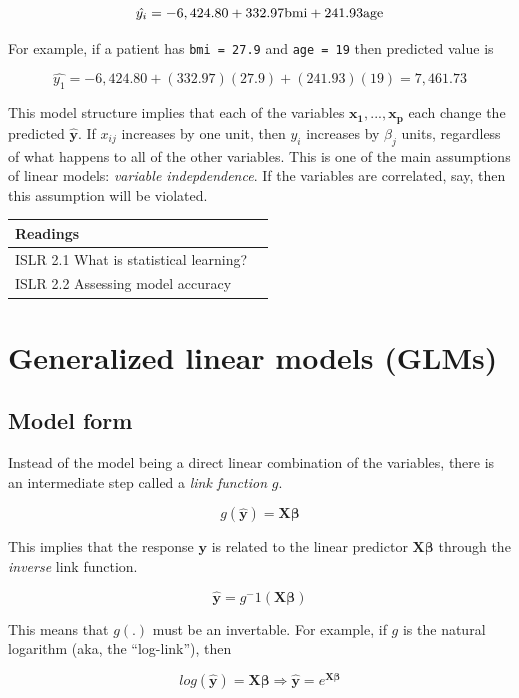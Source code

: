 \documentclass[]{book}
\begin{document}
\[\hat{y_i} = -6,424.80 + 332.97 \space\text{bmi} + 241.93\space \text{age}\]

For example, if a patient has \texttt{bmi\ =\ 27.9} and \texttt{age\ =\ 19} then predicted value is

\[\hat{y_1} = -6,424.80 + (332.97)(27.9) + (241.93)(19) = 7,461.73\]

This model structure implies that each of the variables \(\mathbf{x_1}, ..., \mathbf{x_p}\) each change the predicted \(\mathbf{\hat{y}}\). If \(x_{ij}\) increases by one unit, then \(y_i\) increases by \(\beta_j\) units, regardless of what happens to all of the other variables. This is one of the main assumptions of linear models: \emph{variable indepdendence}. If the variables are correlated, say, then this assumption will be violated.

\begin{longtable}[]{@{}ll@{}}
\toprule
Readings &\tabularnewline
\midrule
\endhead
ISLR 2.1 What is statistical learning? &\tabularnewline
ISLR 2.2 Assessing model accuracy &\tabularnewline
\bottomrule
\end{longtable}

\hypertarget{generalized-linear-models-glms}{%
\chapter{Generalized linear models (GLMs)}\label{generalized-linear-models-glms}}

\hypertarget{model-form}{%
\section{Model form}\label{model-form}}

Instead of the model being a direct linear combination of the variables, there is an intermediate step called a \emph{link function} \(g\).

\[
g(\mathbf{\hat{y}}) = \mathbf{X} \mathbf{\beta}
\]

This implies that the response \(\mathbf{y}\) is related to the linear predictor \(\mathbf{X} \mathbf{\beta}\) through the \emph{inverse} link function.

\[
\mathbf{\hat{y}} = g^-1(\mathbf{X} \mathbf{\beta})
\]

This means that \(g(.)\) must be an invertable. For example, if \(g\) is the natural logarithm (aka, the ``log-link''), then

\[
log(\mathbf{\hat{y}}) = \mathbf{X} \mathbf{\beta} \Rightarrow \mathbf{\hat{y}} = e^{\mathbf{X} \mathbf{\beta}}
\]
\end{document}
